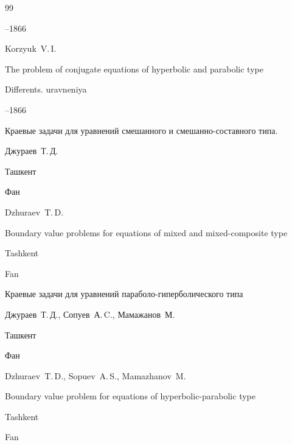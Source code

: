 \begin{thebibliography}{99}

--1866

\misctransl

\by Korzyuk~V.\,I.

\paper The problem of conjugate equations of hyperbolic and parabolic type

\jour Differents. uravneniya



--1866






\book Краевые задачи для уравнений смешанного и смешанно-составного типа.

\by Джураев~Т.\,Д.

\publaddr Ташкент

\publ Фан



\misctransl

\by Dzhuraev~T.\,D.

\book Boundary value problems for equations of mixed and mixed-composite type

\publaddr Tashkent 



\publ Fan






\book Краевые задачи для уравнений параболо-гиперболического типа

\by Джураев~Т.\,Д., Сопуев~А.\,C., Мамажанов~М.

\publaddr Ташкент

\publ Фан



\misctransl 

\by Dzhuraev~T.\,D., Sopuev~A.\,S., Mamazhanov~M.

\book Boundary value problem for equations of hyperbolic-parabolic type

\publaddr Tashkent

\publ Fan








\end{thebibliography}
